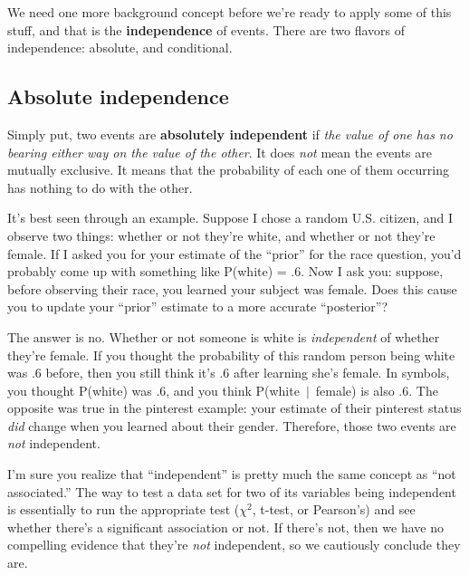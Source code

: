 
We need one more background concept before we're ready to apply some of this
stuff, and that is the \textbf{independence} of events. There are two flavors
of independence: absolute, and conditional.

\subsection{Absolute independence}


Simply put, two events are \textbf{absolutely independent} if \textit{the value
of one has no bearing either way on the value of the other}. It does
\textit{not} mean the events are mutually exclusive. It means that the
probability of each one of them occurring has nothing to do with the other.


It's best seen through an example. Suppose I chose a random U.S. citizen, and I
observe two things: whether or not they're white, and whether or not they're
female. If I asked you for your estimate of the ``prior'' for the race
question, you'd probably come up with something like P(white) = .6. Now I ask
you: suppose, before observing their race, you learned your subject was female.
Does this cause you to update your ``prior'' estimate to a more accurate
``posterior''?

The answer is no. Whether or not someone is white is \textit{independent} of
whether they're female. If you thought the probability of this random person
being white was .6 before, then you still think it's .6 after learning she's
female. In symbols, you thought P(white) was .6, and you think P(white\ $|$\
female) is also .6. The opposite was true in the pinterest example: your
estimate of their pinterest status \textit{did} change when you learned about
their gender. Therefore, those two events are \textit{not} independent.


I'm sure you realize that ``independent'' is pretty much the same concept as
``not associated.'' The way to test a data set for two of its variables being
independent is essentially to run the appropriate test ($\chi^2$, t-test, or
Pearson's) and see whether there's a significant association or not. If there's
not, then we have no compelling evidence that they're \textit{not} independent,
so we cautiously conclude they are. 

